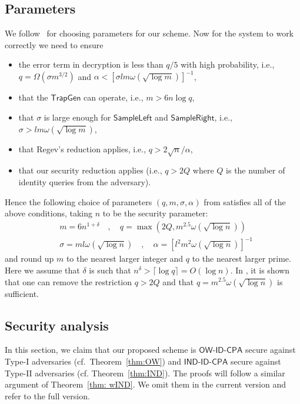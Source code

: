 \documentclass[runningheads]{llncs}
\def\TrapGen{\mathsf{TrapGen}}
\def\SampleLeft{\mathsf{SampleLeft}}
\def\SampleRight{\mathsf{SampleRight}}
\def\OW{\textsf{OW-ID-CPA}}
\def\IND{\textsf{IND-ID-CPA}}
\begin{document}
	\subsection{Parameters}\label{sec:params}
	We follow~{\cite[Section 7.3]{ABB10-EuroCrypt}} for choosing parameters for our scheme. Now for the system to work correctly we need to ensure
	\begin{itemize}
		\item the error term in decryption is less than ${q}/{5}$ with high probability, i.e., $q=\Omega(\sigma m^{3/2})$ and $\alpha<[\sigma lm\omega(\sqrt{\log m})]^{-1}$,
		\item that the $\TrapGen$ can operate, i.e., $m>6n\log q$,
		\item that $\sigma$ is large enough for $\SampleLeft$ and $\SampleRight$, i.e.,
		$\sigma>lm\omega(\sqrt{\log m})$,
		\item that Regev's reduction applies, i.e., $q>2\sqrt{n}/\alpha$,
		\item that our security reduction applies (i.e., $q>2Q$ where $Q$ is the number of identity queries from the adversary).
	\end{itemize}
	Hence the following choice of parameters $(q,m,\sigma,\alpha)$ from \cite{ABB10-EuroCrypt} satisfies all of the above conditions, taking $n$ to be the security parameter:
	\begin{equation}\label{eq:params}
	\begin{aligned}
	& m=6n^{1+\delta}\quad,\quad q=\max(2Q,m^{2.5}\omega(\sqrt{\log n})) \\
	& \sigma = ml\omega(\sqrt{\log n})\quad,\quad\alpha=[l^2m^2\omega(\sqrt{\log n})]^{-1}
	\end{aligned}
	\end{equation}
	and round up $m$ to the nearest larger integer and $q$ to the nearest larger prime. Here we assume that $\delta$ is such that $n^\delta>\lceil\log q\rceil=O(\log n)$. In {\cite[Section 7.5]{ABB10-EuroCrypt}}, it is shown that one can remove the restriction $q>2Q$ and that $q=m^{2.5}\omega(\sqrt{\log n})$ is sufficient.
	\subsection{Security analysis}
	In this section, we claim that our proposed scheme is  $\OW$ secure against Type-I adversaries (cf.~Theorem~\ref{thm:OW}) and $\IND$ secure against Type-II adversaries (cf. Theorem~\ref{thm:IND}). The proofs will follow a similar argument of Theorem~\ref{thm: wIND}. We omit them in the current version and refer to the full version.
	
\end{document}
